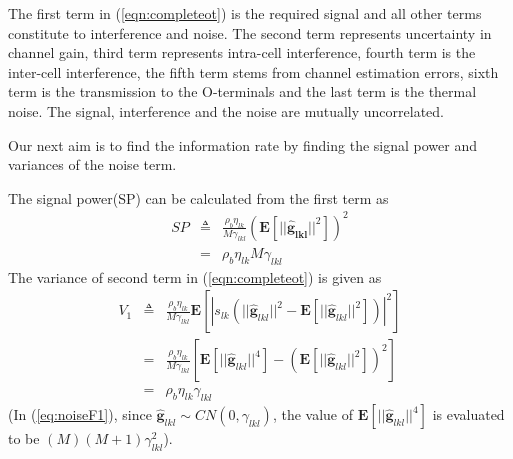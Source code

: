 \documentclass[10pt, a4paper, twoside,fleqn]{article}
\begin{document}
The first term in (\ref{eqn:completeot}) is the required signal and all other terms constitute to interference and noise. The second term represents uncertainty in channel gain, third term represents intra-cell interference, fourth term is the inter-cell interference, the fifth term stems from channel estimation errors, sixth term is the transmission to the O-terminals and the last term is the thermal noise. The signal, interference and the noise are mutually uncorrelated.

Our next aim is to find the information rate by finding the signal power and variances of the noise term. 

The signal power(SP) can be calculated from the first term as
\begin{eqnarray}
	SP &\triangleq&  \frac{\rho_b\eta_{lk}}{M\gamma_{lkl}}(\pmb{E}[||\pmb{\hat g_{lkl}}||^2])^2 \nonumber \\
            &=& \rho_b\eta_{lk}M\gamma_{lkl}
\end{eqnarray}
The variance of second term in (\ref{eqn:completeot}) is given as
\begin{eqnarray}\label{eq:noiseF1}
	V_1 &\triangleq& \frac{\rho_b \eta_{lk}}{M\gamma_{lkl}}   \pmb{E}[|s_{lk}\left(||\pmb{\hat g}_{lkl}||^2- \pmb{E}[||\pmb{\hat  g}_{lkl}||^2] \right)|^2] \nonumber \\
	    &=& \frac{\rho_b \eta_{lk}}{M\gamma_{lkl}}   \left[\pmb{E}[||\pmb{\hat g}_{lkl}||^4] - (\pmb{E}[||\pmb{\hat g}_{lkl}||^2])^2 \right] \nonumber  \\
	    &=& \rho_b\eta_{lk}\gamma_{lkl}
\end{eqnarray}
(In (\ref{eq:noiseF1}), since $\pmb{\hat g}_{lkl} \sim CN(0,\gamma_{lkl})$, the value of $\pmb{E}[||\pmb{\hat g}_{lkl}||^4]$ is evaluated to be $(M)(M+1)\gamma_{lkl}^2$).
\end{document}
